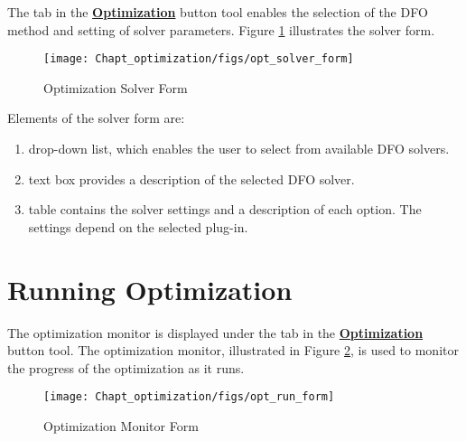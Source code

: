The  tab in the \textbf{\underline{Optimization}} button tool enables the selection of the DFO method and setting of solver parameters. Figure \ref{fig.opt.solver.form} illustrates the solver form.
\begin{figure}[H]
	\begin{center}
		\texttt{[image: Chapt\_optimization/figs/opt\_solver\_form]}
		\caption{Optimization Solver Form}
		\label{fig.opt.solver.form}
	\end{center}
\end{figure}

Elements of the solver form are:
\begin{enumerate}
	\item {} drop-down list, which enables the user to select from available DFO solvers.
	\item {} text box provides a description of the selected DFO solver.
	\item {} table contains the solver settings and a description of each option. The settings depend on the selected plug-in.
\end{enumerate}

\section{Running Optimization}

The optimization monitor is displayed under the  tab in the \textbf{\underline{Optimization}} button tool. The optimization monitor, illustrated in Figure \ref{fig.opt.run.form}, is used to monitor the progress of the optimization as it runs.

\begin{figure}[H]
	\begin{center}
		\texttt{[image: Chapt\_optimization/figs/opt\_run\_form]}
		\caption{Optimization Monitor Form}
		\label{fig.opt.run.form}
	\end{center}
\end{figure}

